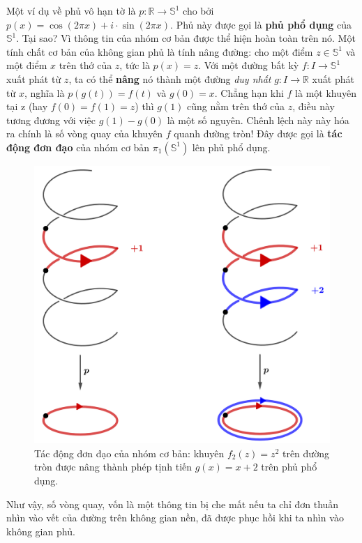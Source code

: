\documentclass[12pt]{article}
\begin{document}
Một ví dụ về phủ vô hạn tờ là $p: \mathbb{R} \to \mathbb{S}^1$ cho bởi $p(x) = \cos(2\pi x)+i \cdot \sin(2\pi x)$. Phủ này được gọi là {\bf phủ phổ dụng} của $\mathbb{S}^1$. Tại sao? Vì thông tin của nhóm cơ bản được thể hiện hoàn toàn trên nó. Một tính chất cơ bản của không gian phủ là tính nâng đường: cho một điểm $z \in \mathbb{S}^1$ và một điểm $x$ trên thớ của $z$, tức là $p(x) = z$. Với một đường bất kỳ $f: I \to \mathbb{S}^1$ xuất phát từ $z$, ta có thể {\bf nâng} nó thành một đường {\it duy nhất} $g: I \to \mathbb{R}$ xuất phát từ $x$, nghĩa là $p(g(t)) = f(t)$ và $g(0) = x$. Chẳng hạn khi $f$ là một khuyên tại z (hay $f(0) = f(1) = z$) thì $g(1)$ cũng nằm trên thớ của $z$, điều này tương đương với việc $g(1) - g(0)$ là một số nguyên. Chênh lệch này này hóa ra chính là số vòng quay của khuyên $f$ quanh đường tròn! Đây được gọi là {\bf tác động đơn đạo} của nhóm cơ bản $\pi_1(\mathbb{S}^1)$ lên phủ phổ dụng.

\begin{figure}[h!]
    \centering
    \includegraphics[scale = .2]{h9.png}
    \caption{Tác động đơn đạo của nhóm cơ bản: khuyên $f_2(z) = z^2$ trên đường tròn được nâng thành phép tịnh tiến $g(x) = x+2$ trên phủ phổ dụng.}
    \label{h9}
\end{figure}

Như vậy, số vòng quay, vốn là một thông tin bị che mất nếu ta chỉ đơn thuần nhìn vào vết của đường trên không gian nền, đã được phục hồi khi ta nhìn vào không gian phủ.
\end{document}
